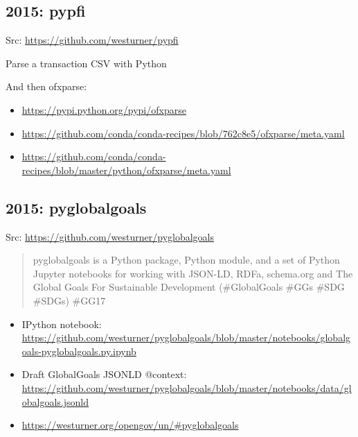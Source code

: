 \documentclass[letter,,openany,oneside]{sphinxhowto}
\begin{document}
\subsection{2015: pypfi}
\label{resume:pypfi}
\begin{DUlineblock}{0em}
\item[] Src: \url{https://github.com/westurner/pypfi}
\end{DUlineblock}

Parse a transaction CSV with Python

And then ofxparse:
\begin{itemize}
\item {} 
\url{https://pypi.python.org/pypi/ofxparse}

\item {} 
\url{https://github.com/conda/conda-recipes/blob/762c8e5/ofxparse/meta.yaml}

\item {} 
\url{https://github.com/conda/conda-recipes/blob/master/python/ofxparse/meta.yaml}

\end{itemize}


\subsection{2015: pyglobalgoals}
\label{resume:pyglobalgoals}
\begin{DUlineblock}{0em}
\item[] Src: \url{https://github.com/westurner/pyglobalgoals}
\end{DUlineblock}
\begin{quote}

pyglobalgoals is a Python package, Python module, and a set of
Python Jupyter notebooks for working with JSON-LD, RDFa, schema.org
and The Global Goals For Sustainable Development (\#GlobalGoals \#GGs
\#SDG \#SDGs) \#GG17
\end{quote}
\begin{itemize}
\item {} 
IPython notebook:
\url{https://github.com/westurner/pyglobalgoals/blob/master/notebooks/globalgoals-pyglobalgoals.py.ipynb}

\item {} 
Draft GlobalGoals JSONLD @context:
\url{https://github.com/westurner/pyglobalgoals/blob/master/notebooks/data/globalgoals.jsonld}

\item {} 
\url{https://westurner.org/opengov/un/\#pyglobalgoals}

\end{itemize}
\end{document}
